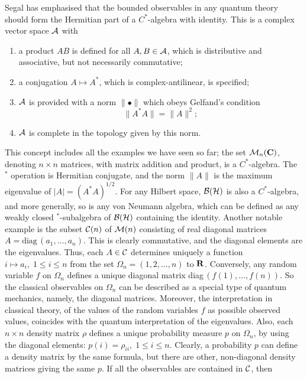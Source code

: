 Segal has emphasised that the bounded observables in any quantum theory
should form the Hermitian part of a $C^*$-algebra with identity. This is
a complex vector space ${\cal A}$ with
\begin{enumerate}
\item a product $AB$ is defined for all $A,B\in{\cal A}$, which is
distributive and associative, but not necessarily commutative;
\item a conjugation $A\mapsto A^*$, which is complex-antilinear, is
specified;
\item ${\cal A}$ is provided with a norm $\|\bullet\|$ which
obeys Gelfand's condition
\begin{equation}
\|A^*A\|=\|A\|^2;
\end{equation}
\item ${\cal A}$ is complete in the topology given by this norm.
\end{enumerate}
This concept includes all the examples we have seen so far; the set
${\cal M}_n({\bf C})$, denoting $n\times n$ matrices, with matrix addition
and product, is a $C^*$-algebra. The $^*$ operation is Hermitian conjugate,
and the norm $\|A\|$ is the maximum eigenvalue of $|A|=(A^*A)^{1/2}$.
For any Hilbert space, ${\cal B}({\cal H})$ is also a $C^*$-algebra,
and more generally, so is any von Neumann algebra, which
can be defined as any weakly closed $^*$-subalgebra of ${\cal B}({\cal H})$
containing the identity. Another notable example
is the subset ${\cal C}(n)$ of ${\cal M}(n)$ consisting of real diagonal
matrices $A=\mbox{diag}\,(a_1,\ldots,a_n)$. This is clearly commutative, and
the diagonal elements are the eigenvalues. Thus, each $A\in{\cal C}$
determines uniquely a function $i\mapsto a_i,\;1\leq i\leq n$ from the
set $\Omega_n=(1,2,\ldots,n)$ to ${\bf R}$. Conversely, any random
variable $f$ on $\Omega_n$ defines a unique diagonal matrix diag$\,(f(1),
\ldots,f(n))$. So the classical observables on $\Omega_n$ can be described
as a special type of quantum mechanics, namely, the diagonal matrices.
Moreover, the interpretation in classical theory, of the values of the
random variables $f$ as possible observed values, coincides with the
quantum interpretation of the eigenvalues. Also, each $n\times n$
density matrix $\rho$ defines a unique probability measure $p$
on $\Omega_n$, by using the diagonal elements: $p(i)=\rho_{ii},\;1\leq 
i\leq n$. Clearly, a probability $p$ can define a density matrix by the
same formula, but there are other, non-diagonal density matrices giving
the same $p$. If all the observables are contained in ${\cal C}$, then
